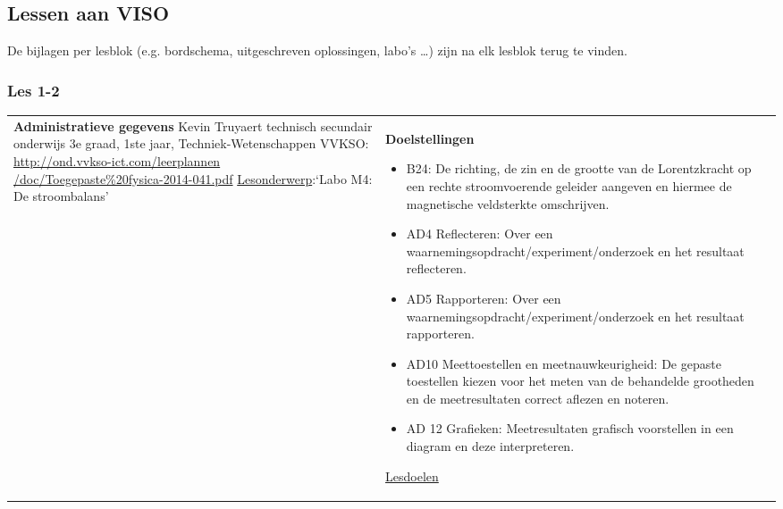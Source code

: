 


\begin{landscape}
	\subsection{Lessen aan VISO}
	De bijlagen per lesblok (e.g. bordschema, uitgeschreven oplossingen, labo's \ldots) zijn na elk lesblok terug te vinden. 
	\subsubsection{Les 1-2}
	\begin{tabularx}{1.56\textwidth}{|p{}|X|}\hline
		\textbf{Administratieve gegevens}\newline\newline
		Kevin Truyaert\newline\newline
		technisch secundair onderwijs\newline
		3e graad, 1ste jaar, Techniek-Wetenschappen\newline
		VVKSO: \href{http://ond.vvkso-ict.com/leerplannen/doc/Toegepaste\%20fysica-2014-041.pdf}{http://ond.vvkso-ict.com/leerplannen /doc/Toegepaste\%20fysica-2014-041.pdf} \newline
		\underline{Lesonderwerp}:\newline `Labo M4: De stroombalans' & \textbf{Doelstellingen}
		\begin{itemize}[itemsep=0.08\baselineskip]
			\item B24: De richting, de zin en de grootte van de Lorentzkracht op een rechte stroomvoerende geleider aangeven en hiermee de magnetische veldsterkte omschrijven. 
			\item AD4 Reflecteren: Over een waarnemingsopdracht/experiment/onderzoek en het resultaat reflecteren.
			\item AD5 Rapporteren: Over een waarnemingsopdracht/experiment/onderzoek en het resultaat rapporteren.
			\item AD10 Meettoestellen en meetnauwkeurigheid: De gepaste toestellen kiezen voor het meten van de behandelde grootheden en de meetresultaten correct aflezen en noteren.
			\item AD 12 Grafieken: Meetresultaten grafisch voorstellen in een diagram en deze interpreteren.
		\end{itemize}
		\underline{Lesdoelen}\newline

\end{tabularx}
\end{landscape}
